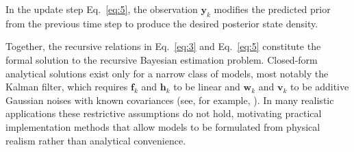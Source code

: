 In the update step Eq.~\eqref{eq:5}, the observation $\bm{y}_k$ modifies the predicted prior from the previous time step to produce the desired posterior state density.

Together, the recursive relations in Eq.~\eqref{eq:3} and Eq.~\eqref{eq:5} constitute the formal solution to the recursive Bayesian estimation problem. Closed-form analytical solutions exist only for a narrow class of models, most notably the Kalman filter, which requires $\bm{f}_k$ and $\bm{h}_k$ to be linear and $\bm{w}_k$ and $\bm{v}_k$ to be additive Gaussian noises with known covariances (see, for example, \cite{r15,r16}). In many realistic applications these restrictive assumptions do not hold, motivating practical implementation methods that allow models to be formulated from physical realism rather than analytical convenience.
